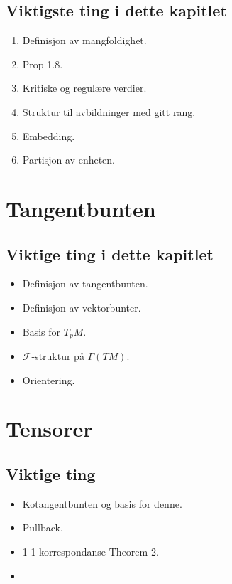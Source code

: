 \documentclass[11pt, english]{article}
\begin{document}
\subsection{Viktigste ting i dette kapitlet}

\begin{enumerate}
\item Definisjon av mangfoldighet.
\item Prop 1.8.
\item Kritiske og regulære verdier.
\item Struktur til avbildninger med gitt rang. 
\item Embedding.
\item Partisjon av enheten.
\end{enumerate}


\section{Tangentbunten}

\subsection{Viktige ting i dette kapitlet}

\begin{itemize}
\item Definisjon av tangentbunten.
\item Definisjon av vektorbunter.
\item Basis for $T_pM$.
\item $\mathscr F$-struktur på $\Gamma(TM)$.
\item Orientering.
\end{itemize}

\section{Tensorer}

\subsection{Viktige ting}

\begin{itemize}
\item Kotangentbunten og basis for denne.
\item Pullback.
\item 1-1 korrespondanse Theorem 2.
\item 
\end{itemize}
\end{document}

